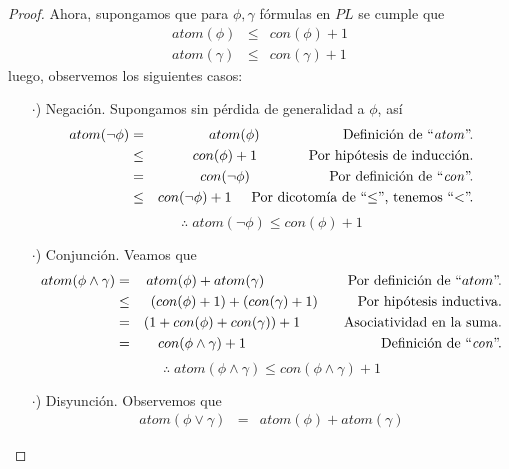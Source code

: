 \documentclass{article}
\begin{document}
\begin{enumerate}
\begin{itemize}
\begin{proof}
    Ahora, supongamos que para $\phi, \gamma$ fórmulas en $PL$ se cumple que
    \begin{eqnarray*}
      atom(\phi) &\leq& con(\phi) + 1\\
      atom(\gamma) &\leq& con(\gamma) + 1
    \end{eqnarray*}
    luego, observemos los siguientes casos:
    \begin{itemize}
    \item[$\cdot$)] Negación. Supongamos sin pérdida de generalidad a $\phi$, así
      \begin{eqnarray*}
        atom(\neg \phi) &=& atom(\phi)
        \hspace*{2.1cm} \text{Definición de ``\textit{atom}''.}\\
        &\leq& con(\phi) + 1
        \hspace*{1.3cm} \text{Por hipótesis de inducción.}\\
        &=& con(\neg \phi)
        \hspace*{2cm} \text{Por definición de ``\textit{con}''.}\\
        &\leq& con(\neg \phi) + 1
        \hspace*{0.5cm} \text{Por dicotomía de ``$\leq$'', tenemos ``$<$''.}
      \end{eqnarray*}
      \[
      \therefore \; atom(\neg \phi) \leq con(\phi) + 1
      \]
    \item[$\cdot$)] Conjunción. Veamos que
      \begin{eqnarray*}
        atom(\phi \land \gamma) &=& atom(\phi) + atom(\gamma)
        \hspace*{2.1cm} \text{Por definición de ``$atom$''.}\\
        &\leq& (con(\phi) + 1) + (con(\gamma) + 1)
        \hspace*{1cm} \text{Por hipótesis inductiva.}\\
        &=& (1 + con(\phi) + con(\gamma)) + 1
        \hspace*{1.1cm} \text{Asociatividad en la suma.}\\
        &=& con(\phi \land \gamma) + 1
        \hspace*{3.4cm} \text{Definición de ``\textit{con}''.}
      \end{eqnarray*}
      \[
      \therefore \; atom(\phi \land \gamma) \leq con(\phi \land \gamma) + 1
      \]
    \item[$\cdot$)] Disyunción. Observemos que
      \begin{eqnarray*}
        atom(\phi \lor \gamma) &=& atom(\phi) + atom(\gamma)

\end{eqnarray*}
\end{itemize}
\end{proof}
\end{itemize}
\end{enumerate}
\end{document}
